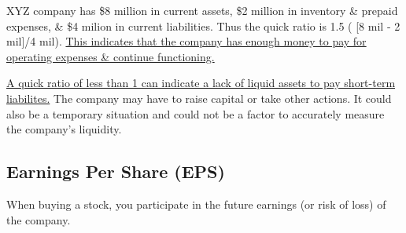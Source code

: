 \documentclass{article}
\begin{document}
	XYZ company has \$8 million in current assets, \$2 million in inventory \& prepaid expenses, \& \$4 milion in current liabilities. Thus the quick ratio is 1.5 ( [8 mil - 2 mil]/4 mil). \underline{This indicates
	that the company has enough money to pay for operating expenses \& continue functioning.} \newline

	\underline{A quick ratio of less than 1 can indicate a lack of liquid assets to pay short-term liabilites.} The company may have to raise capital or take other actions. It could also be a temporary situation 
	and could not be a factor to accurately measure the company's liquidity. \newline

	\subsection{Earnings Per Share (EPS)}
	When buying a stock, you participate in the future earnings (or risk of loss) of the company. 
\end{document}
